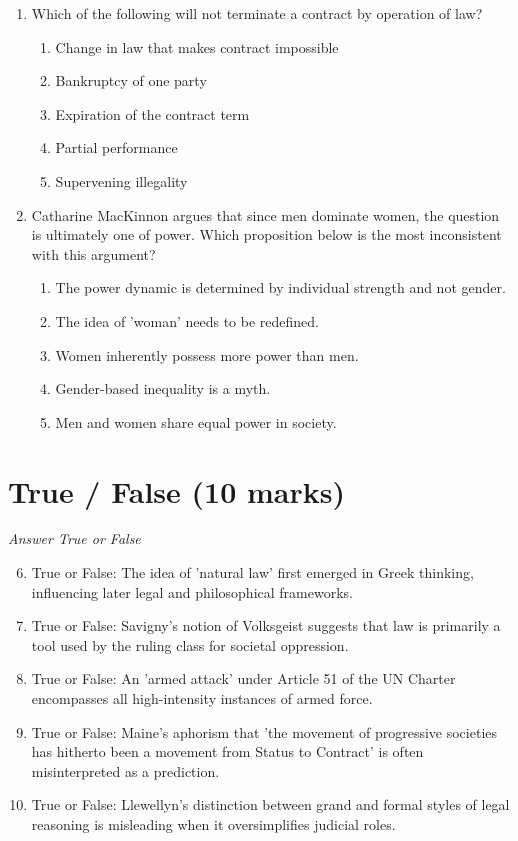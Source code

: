 \documentclass[12pt]{article}
\begin{document}
\begin{enumerate}[label=\arabic*.]
\begin{enumerate}[label=(\alph*)]
    \item Analytical
    \item Sociological
\end{enumerate}
\item Which of the following will not terminate a contract by operation of law?
\begin{enumerate}[label=(\alph*)]
    \item Change in law that makes contract impossible
    \item Bankruptcy of one party
    \item Expiration of the contract term
    \item Partial performance
    \item Supervening illegality
\end{enumerate}
\item Catharine MacKinnon argues that since men dominate women, the question is ultimately one of power. Which proposition below is the most inconsistent with this argument?
\begin{enumerate}[label=(\alph*)]
    \item The power dynamic is determined by individual strength and not gender.
    \item The idea of 'woman' needs to be redefined.
    \item Women inherently possess more power than men.
    \item Gender-based inequality is a myth.
    \item Men and women share equal power in society.
\end{enumerate}
\end{enumerate}

\section*{True / False (10 marks)}
\textit{Answer True or False}
\begin{enumerate}[label=\arabic*.]
\setcounter{enumi}{5}
\item True or False: The idea of 'natural law' first emerged in Greek thinking, influencing later legal and philosophical frameworks.
\item True or False: Savigny's notion of Volksgeist suggests that law is primarily a tool used by the ruling class for societal oppression.
\item True or False: An 'armed attack' under Article 51 of the UN Charter encompasses all high-intensity instances of armed force.
\item True or False: Maine's aphorism that 'the movement of progressive societies has hitherto been a movement from Status to Contract' is often misinterpreted as a prediction.
\item True or False: Llewellyn's distinction between grand and formal styles of legal reasoning is misleading when it oversimplifies judicial roles.
\end{enumerate}
\end{document}
